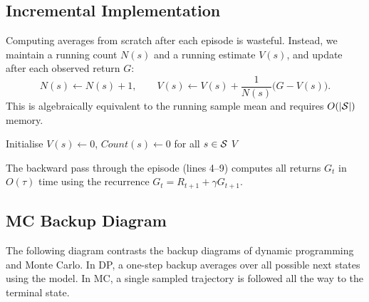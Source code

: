 \subsection*{Incremental Implementation}

Computing averages from scratch after each episode is wasteful.  Instead, we maintain a running count $N(s)$ and a running estimate $V(s)$, and update after each observed return $G$:
\begin{equation}
  \label{eq:mc-incremental}
  N(s) \leftarrow N(s) + 1, \qquad
  V(s) \leftarrow V(s) + \frac{1}{N(s)}\bigl(G - V(s)\bigr).
\end{equation}
This is algebraically equivalent to the running sample mean and requires $O(|\mathcal{S}|)$ memory.

\begin{algorithm}[ht]
\caption{First-Visit Monte Carlo Prediction}
\label{alg:fv-mc-prediction}
Initialise $V(s) \leftarrow 0$, $\mathit{Count}(s) \leftarrow 0$ for all $s \in \mathcal{S}$\;
\Return $V$\;
\end{algorithm}

The backward pass through the episode (lines 4--9) computes all returns $G_t$ in $O(\tau)$ time using the recurrence $G_t = R_{t+1} + \gamma G_{t+1}$.

\subsection*{MC Backup Diagram}

The following diagram contrasts the backup diagrams of dynamic programming and Monte Carlo.  In DP, a one-step backup averages over all possible next states using the model.  In MC, a single sampled trajectory is followed all the way to the terminal state.

